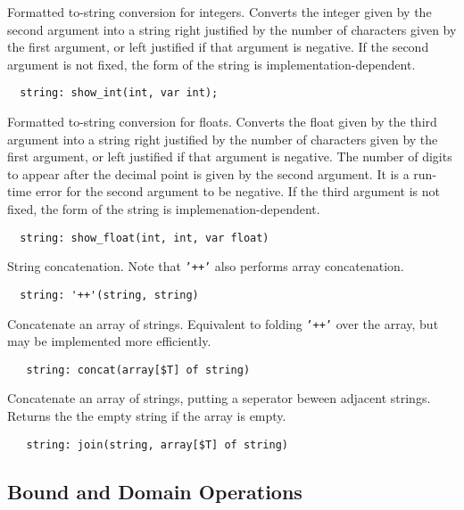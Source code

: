 \documentclass[10pt]{scrartcl}
\begin{document}
\builtin{}
Formatted to-string conversion for integers.
Converts the integer given by the second argument into a string right justified
by the number of characters given by the first argument, or left justified
if that argument is negative.
If the second argument is not fixed, the form of the string is
implementation-dependent.
\begin{verbatim}
  string: show_int(int, var int);
\end{verbatim}

\builtin{}
Formatted to-string conversion for floats.
Converts the float given by the third argument into a string right
justified by the number of characters given by the first argument, or left
justified if that argument is negative.
The number of digits to appear after the decimal point is given by
the second argument.
It is a run-time error for the second argument to be negative.
If the third argument is not fixed, the form of the string is
implemenation-dependent.
\begin{verbatim}
  string: show_float(int, int, var float)
\end{verbatim}

\builtin{}
String concatenation.  Note that \texttt{'++'} also performs array
concatenation.
\begin{verbatim}
  string: '++'(string, string)
\end{verbatim}

\builtin{}
Concatenate an array of strings.
Equivalent to folding \texttt{'++'} over the array, but may be implemented more
efficiently.
\begin{verbatim}
   string: concat(array[$T] of string)
\end{verbatim}

\builtin{}
Concatenate an array of strings, putting a seperator beween adjacent strings.
Returns the the empty string if the array is empty.
\begin{verbatim}
   string: join(string, array[$T] of string)
\end{verbatim}

\subsection{Bound and Domain Operations}
\end{document}
